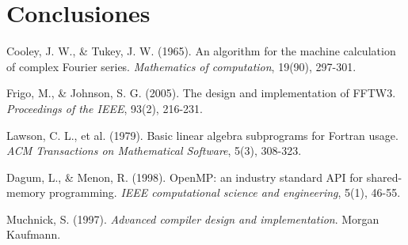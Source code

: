 \documentclass[a4paper]{article}
\begin{document}
\section{Conclusiones}


\begin{thebibliography}{9}
    Cooley, J. W., \& Tukey, J. W. (1965). An algorithm for the machine calculation of complex Fourier series. \textit{Mathematics of computation}, 19(90), 297-301.

    Frigo, M., \& Johnson, S. G. (2005). The design and implementation of FFTW3. \textit{Proceedings of the IEEE}, 93(2), 216-231.

    Lawson, C. L., et al. (1979). Basic linear algebra subprograms for Fortran usage. \textit{ACM Transactions on Mathematical Software}, 5(3), 308-323.

    Dagum, L., \& Menon, R. (1998). OpenMP: an industry standard API for shared-memory programming. \textit{IEEE computational science and engineering}, 5(1), 46-55.

    Muchnick, S. (1997). \textit{Advanced compiler design and implementation}. Morgan Kaufmann.
\end{thebibliography}
\end{document}
